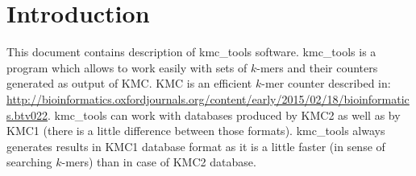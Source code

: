 \clearpage
\section*{Introduction}\label{sec:intro}
This document contains description of \textsf{kmc\_tools} software. \textsf{kmc\_tools} is a program which allows to work easily with sets of $k$-mers and their counters generated as output of \textsf{KMC}. \textsf{KMC} is an efficient $k$-mer counter described in: \url{http://bioinformatics.oxfordjournals.org/content/early/2015/02/18/bioinformatics.btv022}. \textsf{kmc\_tools} can work with databases produced by \textsf{KMC2} as well as by \textsf{KMC1} (there is a little difference between those formats). \textsf{kmc\_tools} always generates results in \textsf{KMC1} database format as it is a little faster (in sense of searching $k$-mers) than in case of \textsf{KMC2} database.